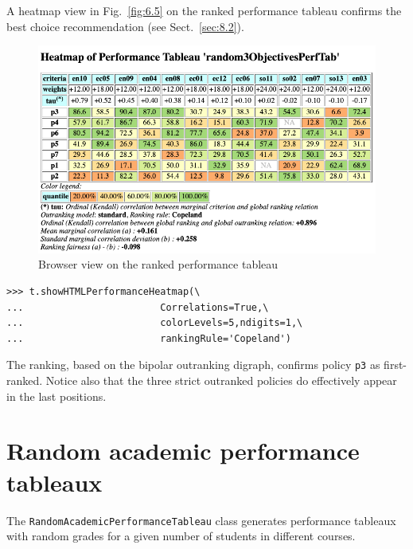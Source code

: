 A heatmap view in Fig.~\vref{fig:6.5} on the \Copeland ranked performance tableau confirms the best choice recommendation (see Sect.~\ref{sec:8.2}).
\begin{figure}[ht]
\includegraphics[width=0.9\hsize]{Figures/6-5-random3ObjHeatmap.png}
\caption{Browser view on the \Copeland ranked performance tableau}
\label{fig:6.5}       %
\end{figure}
\begin{lstlisting}
>>> t.showHTMLPerformanceHeatmap(\
...                        Correlations=True,\
...                        colorLevels=5,ndigits=1,\
...                        rankingRule='Copeland')
\end{lstlisting}

The \Copeland ranking, based on the bipolar outranking digraph, confirms policy \texttt{p3} as first-ranked. Notice also that the three strict outranked policies do effectively appear in the last positions.

\section{Random academic performance tableaux}
\label{sec:6.5}

The \texttt{RandomAcademicPerformanceTableau} class generates performance tableaux with random grades for a given number of students in different courses. 

